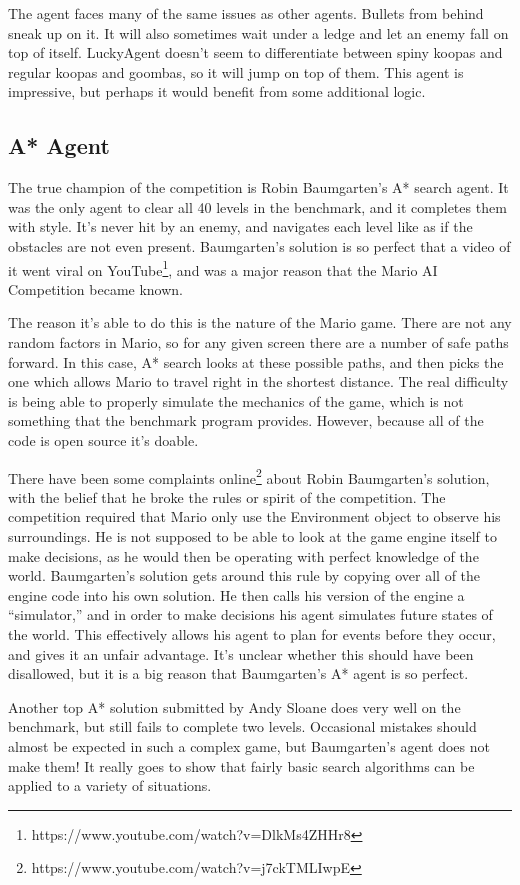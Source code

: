 \documentclass[12pt]{article}
\begin{document}
\begin{multicols*}{2}
The agent faces many of the same issues as other agents.  Bullets from behind sneak up on it.  It 
will also sometimes wait under a ledge and let an enemy fall on top of itself.  LuckyAgent doesn't seem 
to differentiate between spiny koopas and regular koopas and goombas, so it will jump on top of them.  
This agent is impressive, but perhaps it would benefit from some additional logic.

\subsection*{A* Agent}
The true champion of the competition is Robin Baumgarten's A* search agent.  It was the only agent 
to clear all 40 levels in the benchmark, and it completes them with style.  It's never hit by an enemy, 
and navigates each level like as if the obstacles are not even present.  Baumgarten's solution is 
so perfect that a video of it went viral on YouTube\footnote{
https://www.youtube.com/watch?v=DlkMs4ZHHr8}, and was a major reason that the 
Mario AI Competition became known.

The reason it's able to do this is the nature of the Mario game.  There are not any random factors in 
Mario, so for any given screen there are a number of safe paths forward.  In this case, A* search 
looks at these possible paths, and then picks the one which allows Mario to travel right in the shortest 
distance.  The real difficulty is being able to properly simulate the mechanics of the game, which is 
not something that the benchmark program provides.  However, because all of the code is open source 
it's doable.

There have been some complaints online\footnote{
https://www.youtube.com/watch?v=j7ckTMLIwpE} 
about Robin Baumgarten's solution, with the belief that 
he broke the rules or spirit of the competition.  The competition required that Mario only use the 
Environment object to observe his surroundings.  He is not supposed to be able to look at the game 
engine itself to make decisions, as he would then be operating with perfect knowledge of the world.  
Baumgarten's solution gets around this rule by copying over all of the engine code into his own 
solution.  He then calls his version of the engine a ``simulator,'' and in order to make decisions 
his agent simulates future states of the world.  This effectively allows his agent to plan for events 
before they occur, and gives it an unfair advantage.  It's unclear whether this should have been 
disallowed, but it is a big reason that Baumgarten's A* agent is so perfect.

Another  top A* solution submitted by Andy Sloane does very well on the benchmark, 
but still fails to complete 
two levels.  Occasional mistakes should almost be expected in such a complex game, but 
Baumgarten's agent does not make them!  It really goes to show that fairly basic search algorithms 
can be applied to a variety of situations.

\end{multicols*}
\end{document}
